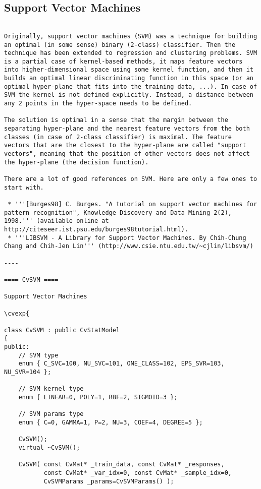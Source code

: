 \subsection{Support Vector Machines}
\begin{verbatim}

Originally, support vector machines (SVM) was a technique for building an optimal (in some sense) binary (2-class) classifier. Then the technique has been extended to regression and clustering problems. SVM is a partial case of kernel-based methods, it maps feature vectors into higher-dimensional space using some kernel function, and then it builds an optimal linear discriminating function in this space (or an optimal hyper-plane that fits into the training data, ...). In case of SVM the kernel is not defined explicitly. Instead, a distance between any 2 points in the hyper-space needs to be defined.

The solution is optimal in a sense that the margin between the separating hyper-plane and the nearest feature vectors from the both classes (in case of 2-class classifier) is maximal. The feature vectors that are the closest to the hyper-plane are called "support vectors", meaning that the position of other vectors does not affect the hyper-plane (the decision function).

There are a lot of good references on SVM. Here are only a few ones to start with.

 * '''[Burges98] C. Burges. "A tutorial on support vector machines for pattern recognition", Knowledge Discovery and Data Mining 2(2), 1998.''' (available online at http://citeseer.ist.psu.edu/burges98tutorial.html).
 * '''LIBSVM - A Library for Support Vector Machines. By Chih-Chung Chang and Chih-Jen Lin''' (http://www.csie.ntu.edu.tw/~cjlin/libsvm/)

----

==== CvSVM ====

Support Vector Machines

\cvexp{

class CvSVM : public CvStatModel
{
public:
    // SVM type
    enum { C_SVC=100, NU_SVC=101, ONE_CLASS=102, EPS_SVR=103, NU_SVR=104 };

    // SVM kernel type
    enum { LINEAR=0, POLY=1, RBF=2, SIGMOID=3 };

    // SVM params type
    enum { C=0, GAMMA=1, P=2, NU=3, COEF=4, DEGREE=5 };

    CvSVM();
    virtual ~CvSVM();

    CvSVM( const CvMat* _train_data, const CvMat* _responses,
           const CvMat* _var_idx=0, const CvMat* _sample_idx=0,
           CvSVMParams _params=CvSVMParams() );


\end{verbatim}
